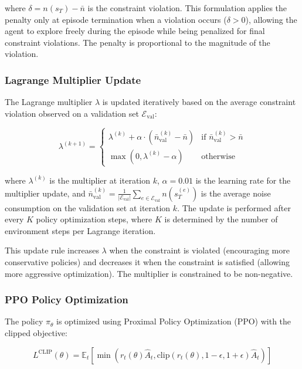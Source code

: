 where $\delta = n(s_T) - \bar{n}$ is the constraint violation. This formulation applies the penalty only at episode termination when a violation occurs ($\delta > 0$), allowing the agent to explore freely during the episode while being penalized for final constraint violations. The penalty is proportional to the magnitude of the violation.

\subsubsection{Lagrange Multiplier Update}

The Lagrange multiplier $\lambda$ is updated iteratively based on the average constraint violation observed on a validation set $\mathcal{E}_{\text{val}}$:

\begin{equation}
\lambda^{(k+1)} = \begin{cases}
\lambda^{(k)} + \alpha \cdot \left( \bar{n}_{\text{val}}^{(k)} - \bar{n} \right) & \text{if } \bar{n}_{\text{val}}^{(k)} > \bar{n} \\
\max\left(0, \lambda^{(k)} - \alpha\right) & \text{otherwise}
\end{cases}
\label{eq:lambda-update}
\tag{12}
\end{equation}

where $\lambda^{(k)}$ is the multiplier at iteration $k$, $\alpha = 0.01$ is the learning rate for the multiplier update, and $\bar{n}_{\text{val}}^{(k)} = \frac{1}{|\mathcal{E}_{\text{val}}|} \sum_{e \in \mathcal{E}_{\text{val}}} n(s_T^{(e)})$ is the average noise consumption on the validation set at iteration $k$. The update is performed after every $K$ policy optimization steps, where $K$ is determined by the number of environment steps per Lagrange iteration.

This update rule increases $\lambda$ when the constraint is violated (encouraging more conservative policies) and decreases it when the constraint is satisfied (allowing more aggressive optimization). The multiplier is constrained to be non-negative.

\subsubsection{PPO Policy Optimization}

The policy $\pi_\theta$ is optimized using Proximal Policy Optimization (PPO) with the clipped objective:

\begin{equation}
L^{\text{CLIP}}(\theta) = \mathbb{E}_t \left[ \min\left( r_t(\theta) \hat{A}_t, \text{clip}(r_t(\theta), 1-\epsilon, 1+\epsilon) \hat{A}_t \right) \right]
\label{eq:ppo-clip}
\tag{13}
\end{equation}

